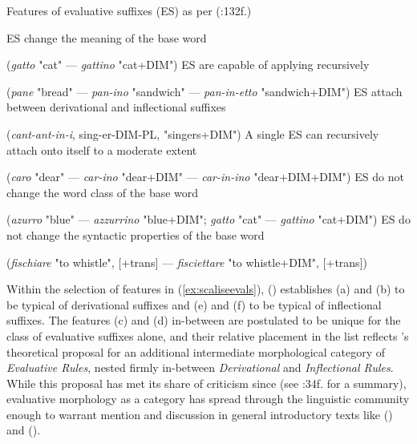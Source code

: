 \begin{exe}
\ex \label{ex:scaliseevals}
Features of evaluative suffixes (ES) as per \citeauthor{Scalise+1986} (\citeyear{Scalise+1986}:132f.)
\begin{xlist}
\ex ES change the meaning of the base word \par
(\textit{gatto} "cat" --- \textit{gattino} "cat+DIM")
\ex ES are capable of applying recursively \par
(\textit{pane} "bread" --- \textit{pan-ino} "sandwich" --- \textit{pan-in-etto} "sandwich+DIM")
\ex ES attach between derivational and inflectional suffixes \par
(\textit{cant-ant-in-i}, sing-er-DIM-PL, "singers+DIM")
\ex A single ES can recursively attach onto itself to a moderate extent \par
(\textit{caro} "dear" --- \textit{car-ino} "dear+DIM" --- \textit{car-in-ino} "dear+DIM+DIM")
\ex ES do not change the word class of the base word \par
(\textit{azurro} "blue" --- \textit{azzurrino} "blue+DIM"; \textit{gatto} "cat" --- \textit{gattino} "cat+DIM")
\ex ES do not change the syntactic properties of the base word \par
(\textit{fischiare} "to whistle", [+trans] --- \textit{fisciettare} "to whistle+DIM", [+trans])
\end{xlist}
\end{exe}

Within the selection of features in (\ref{ex:scaliseevals}), \citeauthor{Scalise+1986} (\citeyear{Scalise+1986}) establishes (a) and (b) to be typical of derivational suffixes and (e) and (f) to be typical of inflectional suffixes. The features (c) and (d) in-between are postulated to be unique for the class of evaluative suffixes alone, and their relative placement in the list reflects \citeauthor{Scalise+1986}'s theoretical proposal for an additional intermediate morphological category of \textit{Evaluative Rules}, nested firmly in-between \textit{Derivational} and \textit{Inflectional Rules}. While this proposal has met its share of criticism since (see \cite{Schneider+2003}:34f. for a summary), evaluative morphology as a category has spread through the linguistic community enough to warrant mention and discussion in general introductory texts like \citeauthor{Booij+2000} (\citeyear{Booij+2000}) and \citeauthor{Schneider+2003} (\citeyear{Schneider+2003}).

